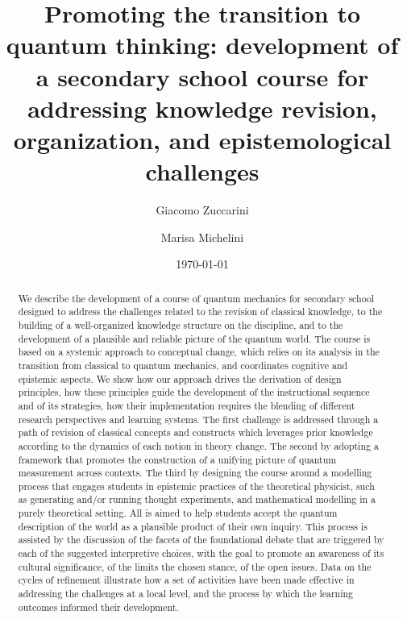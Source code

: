 \documentclass[twocolumn,secnumarabic,amssymb, nobibnotes, aps, prd, nofootinbib]{revtex4-2}
\begin{document}
\title{Promoting the transition to quantum thinking: development of a secondary school course for addressing knowledge revision, organization, and epistemological challenges}


\author{Giacomo Zuccarini}%
\author{Marisa Michelini}%
\date{\today}


\begin{abstract}
We describe the development of a course of quantum mechanics for secondary school designed to address the challenges related to the revision of classical knowledge, to the building of a well-organized knowledge structure on the discipline, and to the development of a plausible and reliable picture of the quantum world. The course is based on a systemic approach to conceptual change, which relies on its analysis in the transition from classical to quantum mechanics, and coordinates cognitive and epistemic aspects. We show how our approach drives the derivation of design principles, how these principles guide the development of the instructional sequence and of its strategies, how their implementation requires the blending of different research perspectives and learning systems. The first challenge is addressed through a path of revision of classical concepts and constructs which leverages prior knowledge according to the dynamics of each notion in theory change. The second by adopting a framework that promotes the construction of a unifying picture of quantum measurement across contexts. The third by designing the course around a modelling process that engages students in epistemic practices of the theoretical physicist, such as generating and/or running thought experiments, and mathematical modelling in a purely theoretical setting. All is aimed to help students accept the quantum description of the world as a plausible product of their own inquiry. This process is assisted by the discussion of the facets of the foundational debate that are triggered by each of the suggested interpretive choices, with the goal to promote an awareness of its cultural significance, of the limits the chosen stance, of the open issues. Data on the cycles of refinement illustrate how a set of activities have been made effective in addressing the challenges at a local level, and the process by which the learning outcomes informed their development.


\end{abstract}
\end{document}
